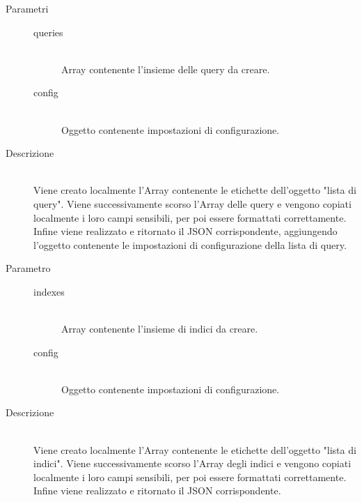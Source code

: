 \begin{description}
\begin{mldescription}
    \hfill
   \begin{description}
    \item[Parametri] \hfill
     \begin{description}
      \item[queries] \hfill \\
      Array contenente l'insieme delle query da creare.
      \item[config] \hfill \\
      Oggetto contenente impostazioni di configurazione.
     \end{description}
    \item[Descrizione] \hfill \\
    Viene creato localmente l'Array contenente le etichette dell'oggetto "lista di query". Viene successivamente scorso l'Array delle query e vengono copiati localmente i loro campi sensibili, per poi essere formattati correttamente. Infine viene realizzato e ritornato il JSON corrispondente, aggiungendo l'oggetto contenente le impostazioni di configurazione della lista di query.
   \end{description}
   
    \hfill
      \begin{description}
       \item[Parametro] \hfill
        \begin{description}
         \item[indexes] \hfill \\
         Array contenente l'insieme di indici da creare.
         \item[config] \hfill \\
         Oggetto contenente impostazioni di configurazione.
        \end{description}
       \item[Descrizione] \hfill \\
       Viene creato localmente l'Array contenente le etichette dell'oggetto "lista di indici". Viene successivamente scorso l'Array degli indici e vengono copiati localmente i loro campi sensibili, per poi essere formattati correttamente. Infine viene realizzato e ritornato il JSON corrispondente.
      \end{description}
   

\end{mldescription}
\end{description}
